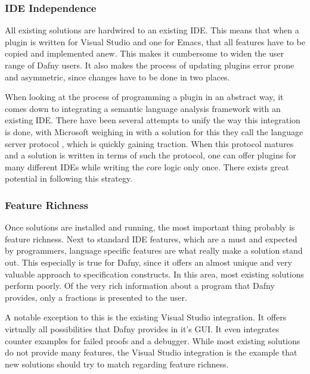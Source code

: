 \subsubsection{IDE Independence}
All existing solutions are hardwired to an existing IDE. This means that when a plugin is written for Visual Studio and one for Emacs, that all features have to be copied and implemented anew. This makes it cumbersome to widen the user range of Dafny users. It also makes the process of updating plugins error prone and asymmetric, since changes have to be done in two places. \newline

When looking at the process of programming a plugin in an abstract way, it comes down to integrating a semantic language analysis framework with an existing IDE. There have been several attempts to unify the way this integration is done, with Microsoft weighing in with a solution for this they call the language server protocol \cite{langserver}, which is quickly gaining traction. When this protocol matures and a solution is written in terms of such the protocol, one can offer plugins for many different IDEs while writing the core logic only once. There exists great potential in following this strategy. 
\newline

\subsubsection{Feature Richness}
Once solutions are installed and running, the most important thing probably is feature richness. Next to standard IDE features, which are a must and expected by programmers, language specific features are what really make a solution stand out. This especially is true for Dafny, since it offers an almost unique and very valuable approach to specification constructs. In this area, most existing solutions perform poorly. Of the very rich information about a program that Dafny provides, only a fractions is presented to the user. \newline

A notable exception to this is the existing Visual Studio integration. It offers virtually all possibilities that Dafny provides in it's GUI. It even integrates counter examples for failed proofs and a debugger. While most existing solutions do not provide many features, the Visual Studio integration is the example that new solutions should try to match regarding feature richness. \newline

